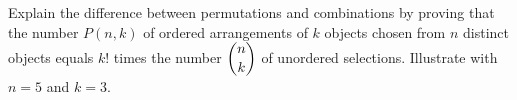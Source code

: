 Explain the difference between permutations and combinations by proving that the number $P(n,k)$ of ordered arrangements of $k$ objects chosen from $n$ distinct objects equals $k!$ times the number $\dbinom nk$ of unordered selections. Illustrate with $n=5$ and $k=3$.
